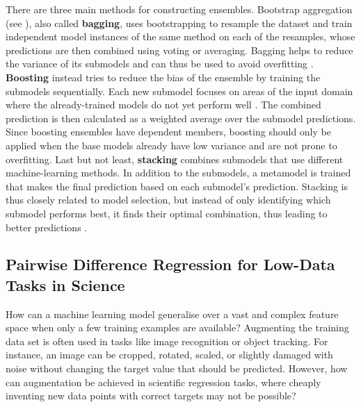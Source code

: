 There are three main methods for constructing ensembles. Bootstrap aggregation (see ), also called \textbf{bagging}, uses bootstrapping to resample the dataset and train independent model instances of the same method on each of the resamples, whose predictions are then combined using voting or averaging. Bagging helps to reduce the variance of its submodels and can thus be used to avoid overfitting \cite{ensemble-overfitting-1995}. \textbf{Boosting} instead tries to reduce the bias of the ensemble by training the submodels sequentially. Each new submodel focuses on areas of the input domain where the already-trained models do not yet perform well \cite{statistical-learning-2009}. The combined prediction is then calculated as a weighted average over the submodel predictions. Since boosting ensembles have dependent members, boosting should only be applied when the base models already have low variance and are not prone to overfitting. Last but not least, \textbf{stacking} combines submodels that use different machine-learning methods. In addition to the submodels, a metamodel is trained that makes the final prediction based on each submodel's prediction. Stacking is thus closely related to model selection, but instead of only identifying which submodel performs best, it finds their optimal combination, thus leading to better predictions \cite{statistical-learning-2009}.

\subsection{Pairwise Difference Regression for Low-Data Tasks in Science} \label{txt:padre-rf}

How can a machine learning model generalise over a vast and complex feature space when only a few training examples are available? Augmenting the training data set is often used in tasks like image recognition or object tracking. For instance, an image can be cropped, rotated, scaled, or slightly damaged with noise without changing the target value that should be predicted. However, how can augmentation be achieved in scientific regression tasks, where cheaply inventing new data points with correct targets may not be possible?

